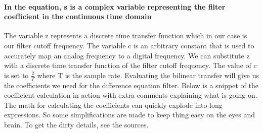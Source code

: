 \documentclass[acmlarge,screen]{acmart}
\begin{document}
	
	\paragraph{In the equation, s is a complex variable representing the filter coefficient in the continuous time domain} The variable z represents a discrete time transfer function which in our case is our filter cutoff frequency. The variable c is an arbitrary constant that is used to accurately map an analog frequency to a digital frequency. We can substitute z with a discrete time transfer function of the  filter cutoff frequency. The value of c is set to \( \frac{2}{T} \) where T is the sample rate. Evaluating the bilinear transfer will give us the coefficients we need for the difference equation filter. Below is a snippet of the coefficient calculation in action with extra comments explaining what is going on. The math for calculating the coefficients can quickly explode into long expressions. So some simplifications are made to keep thing easy on the eyes and brain. To get the dirty details, see the sources.
	
	
	
\end{document}
